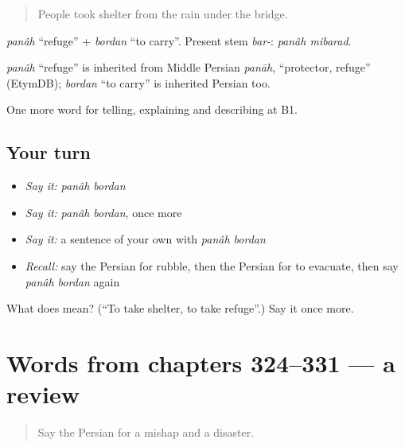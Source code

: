 \begin{quote}
People took shelter from the rain under the bridge.
\end{quote}

\emph{panâh} \textquotedblleft{}refuge\textquotedblright{} + \emph{bordan} \textquotedblleft{}to carry\textquotedblright{}. Present stem \emph{bar-}: \emph{panâh mibarad}.

\begin{cousinweb}
\emph{panâh} \textquotedblleft{}refuge\textquotedblright{} is inherited from Middle Persian \emph{panāh}, \textquotedblleft{}protector, refuge\textquotedblright{} (EtymDB); \emph{bordan} \textquotedblleft{}to carry\textquotedblright{} is inherited Persian too.
\end{cousinweb}

\begin{grammarlens}[title={What you've built}]
One more word for telling, explaining and describing at B1.
\end{grammarlens}

\subsection*{Your turn}
\begin{itemize}
\raggedright
  \item \emph{Say it:} \emph{panâh bordan}
  \item \emph{Say it:} \emph{panâh bordan}, once more
  \item \emph{Say it:} a sentence of your own with \emph{panâh bordan}
  \item \emph{Recall:} say the Persian for rubble, then the Persian for to evacuate, then say \emph{panâh bordan} again
\end{itemize}

\begin{tcolorbox}[breakable,colback=teal!4,colframe=teal!35!black,title={Before you move on}]
What does   mean? (\textquotedblleft{}To take shelter, to take refuge\textquotedblright{}.) Say it once more.
\end{tcolorbox}
\section[(dialogue)]{Words from chapters 324–331 — a review}

\label{lesson:FA-R331-review-324-331}



\begin{quote}
Say the Persian for a mishap and a disaster.
\end{quote}

